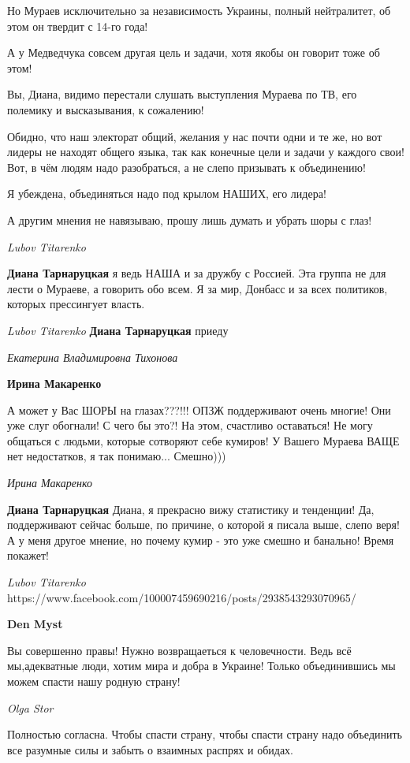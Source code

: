 Но Мураев исключительно за независимость Украины, полный нейтралитет, об этом он твердит с 14-го года!

А у Медведчука совсем другая цель и задачи, хотя якобы он говорит тоже об этом!

Вы, Диана, видимо перестали слушать выступления Мураева по ТВ, его полемику и высказывания, к сожалению!

Обидно, что наш электорат общий, желания у нас почти одни и те же, но вот
лидеры не находят общего языка, так как конечные цели и задачи у каждого свои!
Вот, в чём людям надо разобраться, а не слепо призывать к объединению!

Я убеждена, объединяться надо под крылом НАШИХ, его лидера!

А другим мнения не навязываю, прошу лишь думать и убрать шоры с глаз!

\emph{Lubov Titarenko}

\textbf{Диана Тарнаруцкая} я ведь НАША и за дружбу с Россией. Эта группа не для
лести о Мураеве, а говорить обо всем. Я за мир, Донбасс и за всех политиков,
которых прессингует власть.

\emph{Lubov Titarenko}
\textbf{Диана Тарнаруцкая} приеду

\emph{Екатерина Владимировна Тихонова}

\textbf{Ирина Макаренко}

А может у Вас ШОРЫ на глазах???!!! ОПЗЖ поддерживают очень многие! Они уже слуг
обогнали! С чего бы это?! На этом, счастливо оставаться! Не могу общаться с
людьми, которые сотворяют себе кумиров! У Вашего Мураева ВАЩЕ нет недостатков,
я так понимаю... Смешно)))

\emph{Ирина Макаренко}

\textbf{Диана Тарнаруцкая} Диана, я прекрасно вижу статистику и тенденции! Да,
поддерживают сейчас больше, по причине, о которой я писала выше, слепо веря!  А
у меня другое мнение, но почему кумир - это уже смешно и банально!  Время
покажет!

\emph{Lubov Titarenko}
https://www.facebook.com/100007459690216/posts/2938543293070965/

\textbf{Den Myst}

Вы совершенно правы! Нужно возвращаеться к человечности. Ведь всё мы,адекватные
люди, хотим мира и добра в Украине! Только объединившись мы можем спасти нашу
родную страну!

\emph{Olga Stor}

Полностью согласна. Чтобы спасти страну, чтобы спасти страну надо объединить
все разумные силы и забыть о взаимных распрях и обидах.

